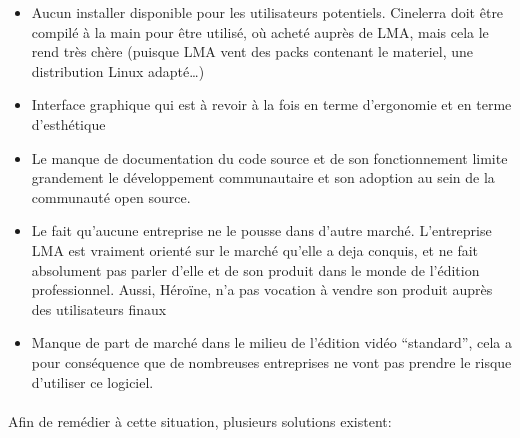 \begin{itemize}

  \item {Aucun installer disponible pour les utilisateurs
  potentiels. Cinelerra doit être
    compilé à la main pour être utilisé, où acheté auprès de LMA,
    mais cela le rend très chère (puisque LMA vent des packs contenant
    le materiel, une distribution Linux adapté\ldots)}

  \item {Interface graphique qui est à revoir à la fois en terme
    d'ergonomie et en terme d'esthétique}

  \item {Le manque de documentation du code source et de son
  fonctionnement
    limite grandement le développement communautaire et son adoption
    au sein de la communauté open source.}

  \item {Le fait qu'aucune entreprise ne le pousse dans d'autre marché.
    L'entreprise LMA est vraiment orienté sur le marché qu'elle a deja
    conquis, et ne fait absolument pas parler d'elle et de son produit
    dans le monde de l'édition professionnel. Aussi, Héroïne, n'a
    pas vocation à vendre son produit auprès des utilisateurs finaux}

  \item {Manque de part de marché dans le milieu de l'édition vidéo
    ``standard'', cela a pour conséquence que de nombreuses entreprises
    ne vont pas prendre le risque d'utiliser ce logiciel.}

\end{itemize}

\paragraph{} Afin de remédier à cette situation, plusieurs solutions
existent:

